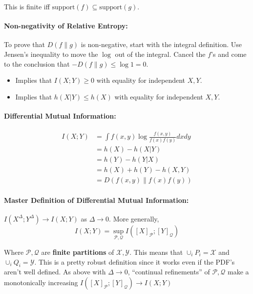 \documentclass[a4paper,12pt]{report}
\begin{document}
This is finite iff $\text{support}(f) \subseteq \text{support}(g)$.

\paragraph{Non-negativity of Relative Entropy: } To prove that $D(f\|g)$ is
non-negative, start with the integral definition. Use Jensen's inequality to
move the $\log$ out of the integral. Cancel the $f$'s and come to the conclusion
that $-D(f\|g)\leq \log 1 = 0$.
\begin{itemize}
\item Implies that $I(X; Y) \geq 0$ with equality for independent $X, Y$.
\item Implies that $h(X | Y) \leq h(X)$ with equality for independent $X, Y$.
\end{itemize}






\paragraph{Differential Mutual Information: } 
\begin{align}
I(X; Y) &= \int f(x,y) \log \frac{f(x,y)}{f(x)f(y)} dxdy \\ 
		&= h(X) - h(X|Y) \\
		&= h(Y) - h(Y|X) \\
		&= h(X) + h(Y) - h(X, Y) \\
		&= D\left( f(x,y) \| f(x)f(y)  \right)
\end{align}

\paragraph{Master Definition of Differential Mutual Information: } $I(X^\Delta;
Y^\Delta) \to I(X; Y)$ as $\Delta \to 0$. More generally, 
\begin{equation}
	I(X; Y) = \sup_{\mathcal P, \mathcal Q} I([X]_{\mathcal P} ; [Y]_{\mathcal Q})
\end{equation}

Where $\mathcal P, \mathcal Q$ are \textbf{finite partitions} of $\mathcal X,
\mathcal Y$. This means that $\cup_i P_i = \mathcal X$ and $\cup_i Q_i =
\mathcal Y$. This is a pretty robust definition since it works even if the PDF's
aren't well defined. As above with $\Delta\to 0$, ``continual refinements'' of
$\mathcal P, \mathcal Q$ make a monotonically increasing $I([X]_{\mathcal P} ;
[Y]_{\mathcal Q}) \to I(X; Y)$
\end{document}
